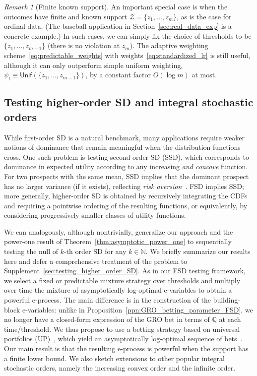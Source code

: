 \documentclass[12pt,twoside]{article}
\theoremstyle{plain}
\theoremstyle{definition}
\theoremstyle{remark}
\newtheorem{remark}{Remark}
\newcommand{\N}{\mathbb{N}}
\newcommand{\calZ}{\mathcal{Z}}
\newcommand{\bbQ}{\mathbb{Q}}
\begin{document}
\begin{remark}[Finite known support]\label{remark:finite_support} 
An important special case is when the outcomes have finite and known support $\calZ = \{z_1, \dotsc, z_m\}$, as is the case for ordinal data. 
(The baseball application in Section~\ref{sec:real_data_exp} is a concrete example.)
In such cases, we can simply fix the choice of thresholds to be $\{z_1, \dotsc, z_{m-1}\}$ (there is no violation at $z_m$).  
The adaptive weighting scheme~\eqref{eq:predictable_weights} with weights~\eqref{eq:standardized_lr} is still useful, although it can only outperform simple uniform weighting, $\psi_t \equiv \mathsf{Unif}(\{z_1, \dotsc, z_{m-1}\})$, by a constant factor $O(\log m)$ at most. 
\end{remark}

\subsection{Testing higher-order SD and integral stochastic orders}\label{sec:testing_kSD_summary}

While first-order SD is a natural benchmark, many applications require weaker notions of dominance that remain meaningful when the distribution functions cross.
One such problem is testing second-order SD (SSD), which corresponds to dominance in expected utility according to any increasing \emph{and concave} function. 
For two prospects with the same mean, SSD implies that the dominant prospect has no larger variance (if it exists), reflecting \emph{risk aversion}~\citep{rothschild1970risk}. 
FSD implies SSD; more generally, higher-order SD is obtained by recursively integrating the CDFs and requiring a pointwise ordering of the resulting functions, or equivalently, by considering progressively smaller classes of utility functions.

We can analogously, although nontrivially, generalize our approach and the power-one result of Theorem~\ref{thm:asymptotic_power_one} to sequentially testing the null of $k$-th order SD for any $k \in \N$.
We briefly summarize our results here and defer a comprehensive treatment of the problem to Supplement~\ref{sec:testing_higher_order_SD}. 
As in our FSD testing framework, we select a fixed or predictable mixture strategy over thresholds and multiply over time the mixture of asymptotically log-optimal e-variables to obtain a powerful e-process. 
The main difference is in the construction of the building-block e-variables: unlike in Proposition~\ref{ppn:GRO_betting_parameter_FSD}, we no longer have a closed-form expression of the GRO bet in terms of $\bbQ$ at each time/threshold. 
We thus propose to use a betting strategy based on universal portfolios (UP)~\citep{cover1991universal}, which yield an asymptotically log-optimal sequence of bets~\citep{waudbysmith2025universal}. 
Our main result is that the resulting e-process is powerful when the support has a finite lower bound.  
We also sketch extensions to other popular integral stochastic orders, namely the increasing convex order and the infinite order. 
\end{document}
